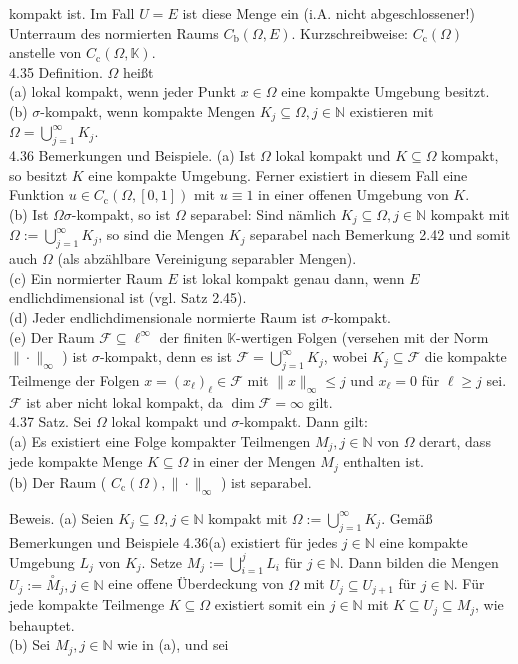 \documentclass[10pt, letterpaper]{article}
\begin{document}
kompakt ist. Im Fall $U=E$ ist diese Menge ein (i.A. nicht abgeschlossener!) Unterraum des normierten Raums $C_{\mathrm{b}}(\Omega, E)$. Kurzschreibweise: $C_{\mathrm{c}}(\Omega)$ anstelle von $C_{\mathrm{c}}(\Omega, \mathbb{K})$.\\
4.35 Definition. $\Omega$ heißt\\
(a) lokal kompakt, wenn jeder Punkt $x \in \Omega$ eine kompakte Umgebung besitzt.\\
(b) $\sigma$-kompakt, wenn kompakte Mengen $K_{j} \subseteq \Omega, j \in \mathbb{N}$ existieren mit $\Omega=\bigcup_{j=1}^{\infty} K_{j}$.\\
4.36 Bemerkungen und Beispiele. (a) Ist $\Omega$ lokal kompakt und $K \subseteq \Omega$ kompakt, so besitzt $K$ eine kompakte Umgebung. Ferner existiert in diesem Fall eine Funktion $u \in C_{\mathrm{c}}(\Omega,[0,1])$ mit $u \equiv 1$ in einer offenen Umgebung von $K$.\\
(b) Ist $\Omega \sigma$-kompakt, so ist $\Omega$ separabel: Sind nämlich $K_{j} \subseteq \Omega, j \in \mathbb{N}$ kompakt mit $\Omega:=\bigcup_{j=1}^{\infty} K_{j}$, so sind die Mengen $K_{j}$ separabel nach Bemerkung 2.42 und somit auch $\Omega$ (als abzählbare Vereinigung separabler Mengen).\\
(c) Ein normierter Raum $E$ ist lokal kompakt genau dann, wenn $E$ endlichdimensional ist (vgl. Satz 2.45).\\
(d) Jeder endlichdimensionale normierte Raum ist $\sigma$-kompakt.\\
(e) Der Raum $\mathcal{F} \subseteq \ell^{\infty}$ der finiten $\mathbb{K}$-wertigen Folgen (versehen mit der Norm $\|\cdot\|_{\infty}$ ) ist $\sigma$-kompakt, denn es ist $\mathcal{F}=\bigcup_{j=1}^{\infty} K_{j}$, wobei $K_{j} \subseteq \mathcal{F}$ die kompakte Teilmenge der Folgen $x=\left(x_{\ell}\right)_{\ell} \in \mathcal{F}$ mit $\|x\|_{\infty} \leq j$ und $x_{\ell}=0$ für $\ell \geq j$ sei. $\mathcal{F}$ ist aber nicht lokal kompakt, da $\operatorname{dim} \mathcal{F}=\infty$ gilt.\\
4.37 Satz. Sei $\Omega$ lokal kompakt und $\sigma$-kompakt. Dann gilt:\\
(a) Es existiert eine Folge kompakter Teilmengen $M_{j}, j \in \mathbb{N}$ von $\Omega$ derart, dass jede kompakte Menge $K \subseteq \Omega$ in einer der Mengen $M_{j}$ enthalten ist.\\
(b) Der Raum ( $C_{\mathrm{c}}(\Omega),\|\cdot\|_{\infty}$ ) ist separabel.

Beweis. (a) Seien $K_{j} \subseteq \Omega, j \in \mathbb{N}$ kompakt mit $\Omega:=\bigcup_{j=1}^{\infty} K_{j}$. Gemäß Bemerkungen und Beispiele 4.36(a) existiert für jedes $j \in \mathbb{N}$ eine kompakte Umgebung $L_{j}$ von $K_{j}$. Setze $M_{j}:=\bigcup_{i=1}^{j} L_{i}$ für $j \in \mathbb{N}$. Dann bilden die Mengen $U_{j}:=\stackrel{\circ}{M}_{j}, j \in \mathbb{N}$ eine offene Überdeckung von $\Omega$ mit $U_{j} \subseteq U_{j+1}$ für $j \in \mathbb{N}$. Für jede kompakte Teilmenge $K \subseteq \Omega$ existiert somit ein $j \in \mathbb{N}$ mit $K \subseteq U_{j} \subseteq M_{j}$, wie behauptet.\\
(b) Sei $M_{j}, j \in \mathbb{N}$ wie in (a), und sei
\end{document}
